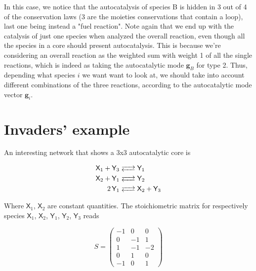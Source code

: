 \documentclass{article}
\begin{document}
In this case, we notice that the autocatalysis of species B is hidden in 3 out of 4 of the conservation laws (3 are the moieties conservations that contain a loop), last one being instead a "fuel reaction".
Note again that we end up with the catalysis of just one species when analyzed the overall reaction, even though all the species in a core should present autocatalysis. This is because we're considering an overall reaction as the weighted sum with weight 1 of all the single reactions, which is indeed as taking the autocatalytic mode $\mathbf{g}_B$ for type 2. Thus, depending what species $i$ we want want to look at, we should take into account different combinations of the three reactions, according to the autocatalytic mode vector $\mathbf{g}_i$.
\\

\section{Invaders' example}
An interesting network that shows a 3x3 autocatalytic core is 

\begin{equation}
		\begin{split}
  \ce{\textsf{X}_1 + \textsf{Y}_3& <--> \textsf{Y}_1 }	\\
  \ce{\textsf{X}_2 + \textsf{Y}_1 & <-->  \textsf{Y}_2 } \\
  \ce{2\textsf{Y}_1 & <-->  \textsf{X}_2 + \textsf{Y}_3 }
		\end{split} 
\end{equation}



Where $\textsf{X}_1$, $\textsf{X}_2$ are constant quantities. The stoichiometric matrix for respectively species $\textsf{X}_1$, $\textsf{X}_2$, $\textsf{Y}_1$, $\textsf{Y}_2$, $\textsf{Y}_3$ reads

\begin{center}
    \begin{equation}
        S=\begin{pmatrix}
            -1 & 0 & 0 \\
            0 & -1 & 1 \\
            1 & -1 & -2 \\
            0 & 1 & 0 \\
            -1 & 0 & 1
\end{pmatrix}
    \end{equation}
    \end{center}
\end{document}
